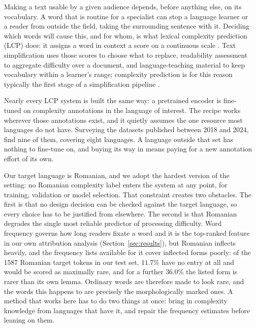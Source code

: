 Making a text usable by a given audience depends, before anything else,
on its vocabulary. A word that is routine for a specialist can stop a
language learner or a reader from outside the field, taking the
surrounding sentence with it. Deciding which
words will cause this, and for whom, is what lexical complexity
prediction (LCP) does: it assigns a word in context a score on a
continuous scale \citep{shardlow-etal-2021-semeval}. Text simplification
uses those scores to choose what to replace, readability assessment to
aggregate difficulty over a document, and language-teaching material to
keep vocabulary within a learner's range; complexity prediction is for
this reason typically the first stage of a simplification pipeline
\citep{qiu-etal-2024-complex}.

Nearly every LCP system is built the same way: a pretrained encoder is
fine-tuned on complexity annotations in the language of interest. The
recipe works wherever those annotations exist, and it quietly assumes the
one resource most languages do not have. Surveying the datasets published
between 2018 and 2024, \citet{shardlow-etal-2024-multilingual} find nine
of them, covering eight languages. A language outside that set has
nothing to fine-tune on, and buying its way in means paying for a new
annotation effort of its own.

Our target language is Romanian, and we adopt the hardest version of the
setting: no Romanian complexity label enters the system at any point, for
training, validation or model selection. That constraint creates two
obstacles. The first is that no design decision
can be checked against the target language, so every choice has to be
justified from elsewhere. The second is that Romanian degrades the single
most reliable predictor of processing difficulty. Word frequency governs how long readers fixate
a word \citep{rayner1998eye} and it is the top-ranked feature in our own
attribution analysis (Section~\ref{sec:results}), but Romanian inflects
heavily, and the frequency lists available for it cover inflected forms
poorly: of the 1587 Romanian target tokens in our test set, $11.7\%$ have
no entry at all and would be scored as maximally rare, and for a further
$36.0\%$ the listed form is rarer than its own lemma. Ordinary words are
therefore made to look rare, and the words this happens to are precisely
the morphologically marked ones. A method that works here has to do two
things at once: bring in complexity knowledge from languages that have
it, and repair the frequency estimates before leaning on them.

